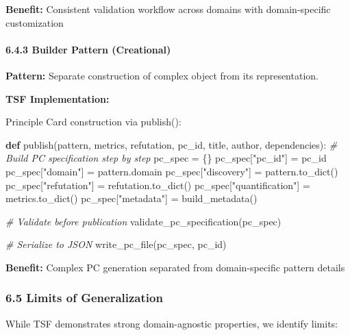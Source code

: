 \documentclass[
]{article}
\newenvironment{Shaded}{}{}
\newcommand{\CommentTok}[1]{\textcolor[rgb]{0.38,0.63,0.69}{\textit{#1}}}
\newcommand{\KeywordTok}[1]{\textcolor[rgb]{0.00,0.44,0.13}{\textbf{#1}}}
\newcommand{\NormalTok}[1]{#1}
\newcommand{\OperatorTok}[1]{\textcolor[rgb]{0.40,0.40,0.40}{#1}}
\newcommand{\StringTok}[1]{\textcolor[rgb]{0.25,0.44,0.63}{#1}}
\begin{document}
\textbf{Benefit:} Consistent validation workflow across domains with
domain-specific customization

\paragraph{6.4.3 Builder Pattern
(Creational)}\label{builder-pattern-creational}

\textbf{Pattern:} Separate construction of complex object from its
representation.

\textbf{TSF Implementation:}

Principle Card construction via publish():

\begin{Shaded}
\begin{Highlighting}[]
\KeywordTok{def}\NormalTok{ publish(pattern, metrics, refutation, pc\_id, title, author, dependencies):}
    \CommentTok{\# Build PC specification step by step}
\NormalTok{    pc\_spec }\OperatorTok{=}\NormalTok{ \{\}}
\NormalTok{    pc\_spec[}\StringTok{"pc\_id"}\NormalTok{] }\OperatorTok{=}\NormalTok{ pc\_id}
\NormalTok{    pc\_spec[}\StringTok{"domain"}\NormalTok{] }\OperatorTok{=}\NormalTok{ pattern.domain}
\NormalTok{    pc\_spec[}\StringTok{"discovery"}\NormalTok{] }\OperatorTok{=}\NormalTok{ pattern.to\_dict()}
\NormalTok{    pc\_spec[}\StringTok{"refutation"}\NormalTok{] }\OperatorTok{=}\NormalTok{ refutation.to\_dict()}
\NormalTok{    pc\_spec[}\StringTok{"quantification"}\NormalTok{] }\OperatorTok{=}\NormalTok{ metrics.to\_dict()}
\NormalTok{    pc\_spec[}\StringTok{"metadata"}\NormalTok{] }\OperatorTok{=}\NormalTok{ build\_metadata()}

    \CommentTok{\# Validate before publication}
\NormalTok{    validate\_pc\_specification(pc\_spec)}

    \CommentTok{\# Serialize to JSON}
\NormalTok{    write\_pc\_file(pc\_spec, pc\_id)}
\end{Highlighting}
\end{Shaded}

\textbf{Benefit:} Complex PC generation separated from domain-specific
pattern details

\subsubsection{6.5 Limits of
Generalization}\label{limits-of-generalization}

While TSF demonstrates strong domain-agnostic properties, we identify
limits:
\end{document}
